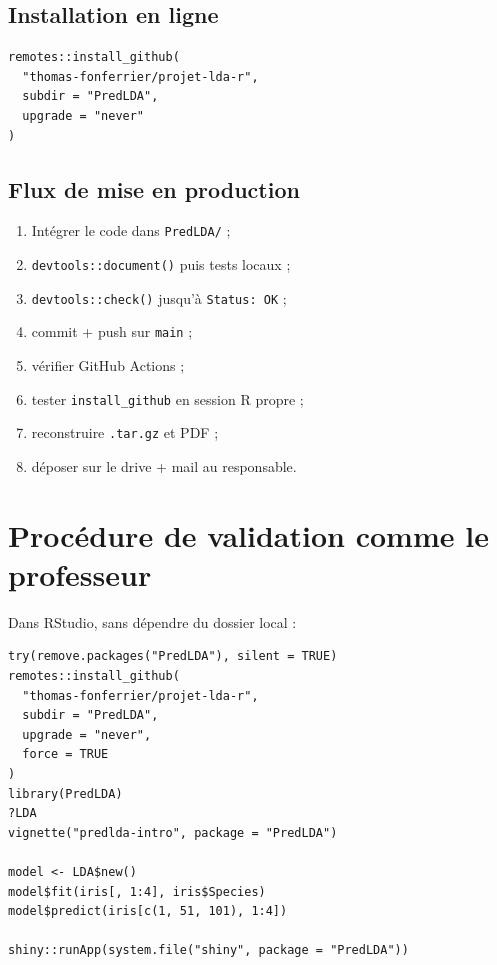 \documentclass[11pt,a4paper]{article}
\begin{document}
\subsection{Installation en ligne}

\begin{lstlisting}
remotes::install_github(
  "thomas-fonferrier/projet-lda-r",
  subdir = "PredLDA",
  upgrade = "never"
)
\end{lstlisting}

\subsection{Flux de mise en production}

\begin{enumerate}[leftmargin=*]
  \item Int\'egrer le code dans \texttt{PredLDA/} ;
  \item \texttt{devtools::document()} puis tests locaux ;
  \item \texttt{devtools::check()} jusqu'\`a \texttt{Status: OK} ;
  \item commit + push sur \texttt{main} ;
  \item v\'erifier GitHub Actions ;
  \item tester \texttt{install\_github} en session R propre ;
  \item reconstruire \texttt{.tar.gz} et PDF ;
  \item d\'eposer sur le drive + mail au responsable.
\end{enumerate}

\section{Proc\'edure de validation \og comme le professeur \fg{}}

Dans RStudio, sans d\'ependre du dossier local :

\begin{lstlisting}
try(remove.packages("PredLDA"), silent = TRUE)
remotes::install_github(
  "thomas-fonferrier/projet-lda-r",
  subdir = "PredLDA",
  upgrade = "never",
  force = TRUE
)
library(PredLDA)
?LDA
vignette("predlda-intro", package = "PredLDA")

model <- LDA$new()
model$fit(iris[, 1:4], iris$Species)
model$predict(iris[c(1, 51, 101), 1:4])

shiny::runApp(system.file("shiny", package = "PredLDA"))
\end{lstlisting}
\end{document}
